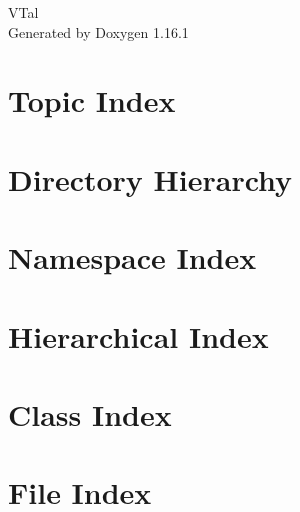 \documentclass[twoside]{book}
\newcommand{\+}{\discretionary{\mbox{\scriptsize$\hookleftarrow$}}{}{}}
\newcommand{\clearemptydoublepage}{%
    \newpage{\pagestyle{empty}\cleardoublepage}%
  }
\begin{document}
  \raggedbottom
    \hypersetup{pageanchor=false,
                bookmarksnumbered=true,
                pdfencoding=unicode
               }
  \begin{titlepage}
  \vspace*{7cm}
  \begin{center}%
  {\Large VTal}\\
  \vspace*{1cm}
  {\large Generated by Doxygen 1.16.1}\\
  \end{center}
  \end{titlepage}
  \clearemptydoublepage
  \tableofcontents
  \clearemptydoublepage
  \hypersetup{pageanchor=true}




\chapter{Topic Index}

\chapter{Directory Hierarchy}

\chapter{Namespace Index}

\chapter{Hierarchical Index}

\chapter{Class Index}

\chapter{File Index}

\end{document}
